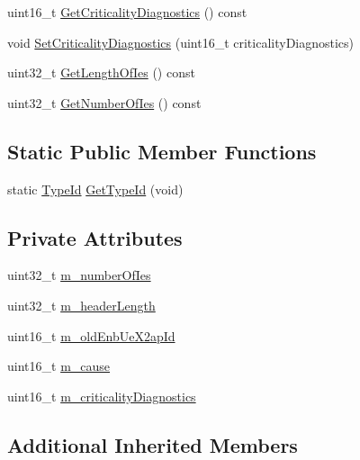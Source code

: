\begin{DoxyCompactItemize}
uint16\+\_\+t \hyperlink{classns3_1_1EpcX2HandoverPreparationFailureHeader_a34a4d408fdfdc437fbef8f204453d75a}{Get\+Criticality\+Diagnostics} () const 
\item 
void \hyperlink{classns3_1_1EpcX2HandoverPreparationFailureHeader_a1f7ace74b4919bfb45c658314418c947}{Set\+Criticality\+Diagnostics} (uint16\+\_\+t criticality\+Diagnostics)
\item 
uint32\+\_\+t \hyperlink{classns3_1_1EpcX2HandoverPreparationFailureHeader_a9618d31840436e520de9e9600992b4c9}{Get\+Length\+Of\+Ies} () const 
\item 
uint32\+\_\+t \hyperlink{classns3_1_1EpcX2HandoverPreparationFailureHeader_a415c4061a28ef0131730fc5ff1b5513b}{Get\+Number\+Of\+Ies} () const 
\end{DoxyCompactItemize}
\subsection*{Static Public Member Functions}
\begin{DoxyCompactItemize}
\item 
static \hyperlink{classns3_1_1TypeId}{Type\+Id} \hyperlink{classns3_1_1EpcX2HandoverPreparationFailureHeader_a64ee94a009e99fd20931321ef42bb7ab}{Get\+Type\+Id} (void)
\end{DoxyCompactItemize}
\subsection*{Private Attributes}
\begin{DoxyCompactItemize}
\item 
uint32\+\_\+t \hyperlink{classns3_1_1EpcX2HandoverPreparationFailureHeader_ab530f263ee47d7e93a0acaeeaf30ded3}{m\+\_\+number\+Of\+Ies}
\item 
uint32\+\_\+t \hyperlink{classns3_1_1EpcX2HandoverPreparationFailureHeader_a8c82d898bfa520fa8a17454243d0dc4b}{m\+\_\+header\+Length}
\item 
uint16\+\_\+t \hyperlink{classns3_1_1EpcX2HandoverPreparationFailureHeader_ab5eea0838833dc61a698ed04070e06d5}{m\+\_\+old\+Enb\+Ue\+X2ap\+Id}
\item 
uint16\+\_\+t \hyperlink{classns3_1_1EpcX2HandoverPreparationFailureHeader_ac3f14501e0e39dcc348aa4ddcc9b8da1}{m\+\_\+cause}
\item 
uint16\+\_\+t \hyperlink{classns3_1_1EpcX2HandoverPreparationFailureHeader_a7c2ea806241ee62302f90e51947e465f}{m\+\_\+criticality\+Diagnostics}
\end{DoxyCompactItemize}
\subsection*{Additional Inherited Members}


